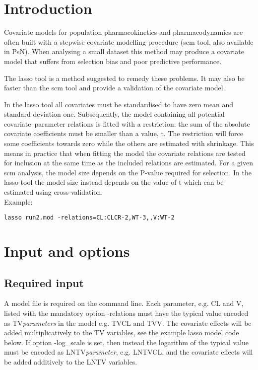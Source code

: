 
\usepackage{hyperref}




\maketitle
\newcommand{\guidetoolname}{lasso}
\tableofcontents
\newpage

\section{Introduction}
Covariate models for population pharmacokinetics and pharmacodynamics are often built with a stepwise covariate modelling procedure (scm tool, also available in PsN). When analysing a small dataset this method may produce a covariate model that suffers from selection bias and poor predictive performance. 

The lasso tool \cite{Ribbing} is a method suggested to remedy these problems. It may also be faster than the scm tool and provide a validation of the covariate model. 

In the lasso tool all covariates must be standardised to have zero mean and standard deviation one. Subsequently, the model containing all potential covariate–parameter relations is fitted with a restriction: the sum of the absolute covariate coefficients must be smaller than a value, t. The restriction will force some coefficients towards zero while the others are estimated with shrinkage. This means in practice that when fitting the model the covariate relations are tested for inclusion at the same time as the included relations are estimated. For a given scm analysis, the model size depends on the P-value required for selection. In the lasso tool the model size instead depends on the value of t which can be estimated using cross-validation.
\\Example:
\begin{verbatim}
lasso run2.mod -relations=CL:CLCR-2,WT-3,,V:WT-2
\end{verbatim}

\section{Input and options}

\subsection{Required input}
A model file is required on the command line. Each parameter, e.g. CL and V, listed with the mandatory option -relations must  have the typical value encoded as TV\emph{parameters} in the model e.g. TVCL and TVV. The covariate effects will be added multiplicatively to the TV variables, see the example lasso model code below. If option -log\_scale is set, then instead the logarithm of the typical value must be encoded as LNTV\emph{parameter}, e.g. LNTVCL, and the covariate effects will be added additively to the LNTV variables.

